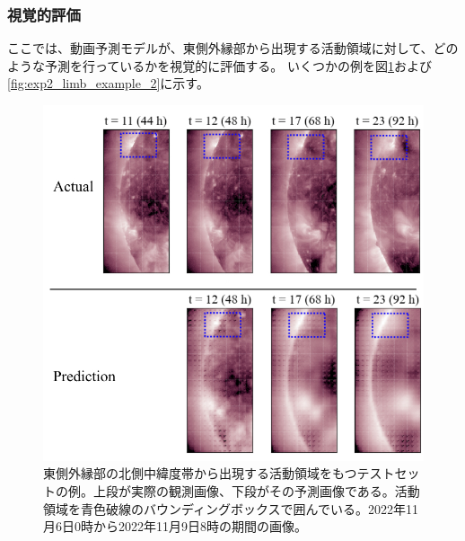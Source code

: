       \subsubsection{視覚的評価}
        ここでは、動画予測モデルが、東側外縁部から出現する活動領域に対して、どのような予測を行っているかを視覚的に評価する。
        いくつかの例を図\ref{fig:exp2_limb_example_1}および\ref{fig:exp2_limb_example_2}に示す。
        \begin{figure}[htbp]
          \centering
          \includegraphics[width=\textwidth]{figures/exp2/limb_sample_3_caption.jpg}
          \caption{東側外縁部の北側中緯度帯から出現する活動領域をもつテストセットの例。上段が実際の観測画像、下段がその予測画像である。活動領域を青色破線のバウンディングボックスで囲んでいる。2022年11月6日0時から2022年11月9日8時の期間の画像。}
          \label{fig:exp2_limb_example_1}
        \end{figure}

